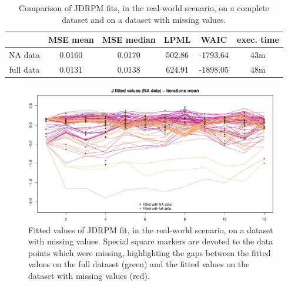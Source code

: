 \documentclass[12pt,	%
	a4paper,		%
	twoside,		%
	openright,		%
	titlepage,%
	]{book}
\theoremstyle{definition}
\begin{document}
\begin{table}[!ht]
    \caption[Comparison of JDRPM, real-world scenario, dataset with missing values]{Comparison of JDRPM fits, in the real-world scenario, on a complete dataset and on a dataset with missing values.}
    \centering
    \begin{tabular}{cccccc}
    \toprule
            & MSE mean &  MSE median & LPML & WAIC & exec. time  \\
           \midrule 
        NA data & 0.0160 &  0.0170  &  502.86 & -1793.64 & 43m\\
        full data & 0.0131  & 0.0138   & 624.91 & -1898.05  &  48m \\
        \bottomrule
    \end{tabular}
    \label{tab: fits metrics space julias na full}
\end{table}

\begin{figure}[!ht]
    \centering
    \includegraphics[width=1\linewidth]{Testing/NA data/space/J_mean_prediction.pdf}
    \caption[Fitted values of JDRPM, real-world scenario, dataset with missing values]{Fitted values of JDRPM fit, in the real-world scenario, on a dataset with missing values. Special square markers are devoted to the data points which were missing, highlighting the gaps between the fitted values on the full dataset (green) and the fitted values on the dataset with missing values (red).}
    \label{fig: target values estimates space NA}
\end{figure}
\end{document}
